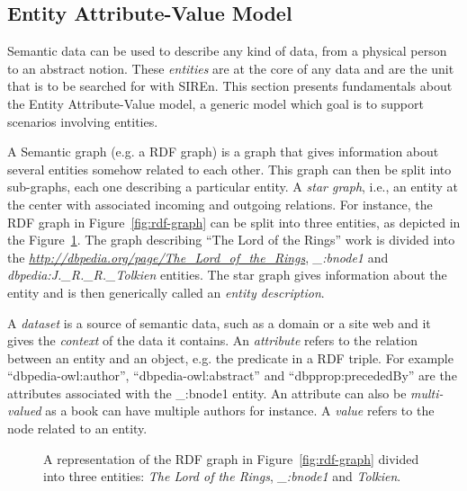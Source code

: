 \subsection{Entity Attribute-Value Model}

Semantic data can be used to describe any kind of data, from a physical person
to an abstract notion. These \emph{entities} are at the core of any data and
are the unit that is to be searched for with SIREn. This section presents
fundamentals about the Entity Attribute-Value model, a generic model which goal
is to support scenarios involving entities.

A Semantic graph (e.g. a RDF graph) is a graph that gives information about
several entities somehow related to each other. This graph can then be split
into sub-graphs, each one describing a particular entity. A \emph{star graph},
i.e., an entity at the center with associated incoming and outgoing relations.
For instance, the RDF graph in Figure~\ref{fig:rdf-graph} can be split into
three entities, as depicted in the Figure~\ref{fig:entities}. The graph
describing ``The Lord of the Rings'' work is divided into the
\emph{\url{http://dbpedia.org/page/The_Lord_of_the_Rings}}, \emph{\_:bnode1}
and \emph{dbpedia:J.\_R.\_R.\_Tolkien} entities.
The star graph gives information about the entity and is then generically
called an \emph{entity description}.

A \emph{dataset} is a source of semantic data, such as a domain or a site web
and it gives the \emph{context} of the data it contains. An \emph{attribute}
refers to the relation between an entity and an object, e.g. the predicate in
a RDF triple. For example ``dbpedia-owl:author'', ``dbpedia-owl:abstract'' and
``dbpprop:precededBy'' are the attributes associated with the \_:bnode1
entity. An attribute can also be \emph{multi-valued} as a book can have
multiple authors for instance. A \emph{value} refers to the node related to an
entity.

\begin{figure}
\centering
{}%
\caption{A representation of the RDF graph in Figure~\ref{fig:rdf-graph}
divided into three entities: \emph{The Lord of the Rings}, \emph{\_:bnode1}
and \emph{Tolkien}.}
\label{fig:entities}
\end{figure}

